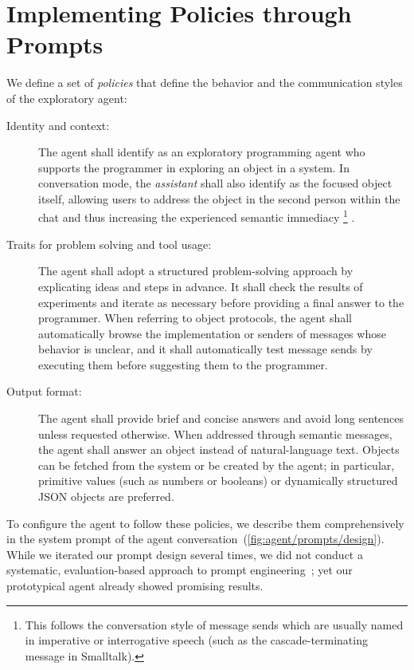 
\section{Implementing Policies through Prompts}
\label{sec:agent/prompts}

We define a set of \emph{policies} that define the behavior and the communication styles of the exploratory agent:

\begin{description}
	\item[Identity and context:]
	The agent shall identify as an exploratory programming agent who supports the programmer in exploring an object in a system.
	In conversation mode, the \emph{assistant} shall also identify as the focused object itself, allowing users to address the object in the second person within the chat and thus increasing the experienced semantic immediacy%
	\footnote{This follows the conversation style of message sends which are usually named in imperative or interrogative speech (such as the cascade-terminating message  in Smalltalk).}%
	.
	\item[Traits for problem solving and tool usage:]
	The agent shall adopt a structured problem-solving approach by explicating ideas and steps in advance.
	It shall check the results of experiments and iterate as necessary before providing a final answer to the programmer.
	When referring to object protocols, the agent shall automatically browse the implementation or senders of messages whose behavior is unclear, and it shall automatically test message sends by executing them before suggesting them to the programmer.
	\item[Output format:]
	The agent shall provide brief and concise answers and avoid long sentences unless requested otherwise.
	When addressed through semantic messages, the agent shall answer an object instead of natural-language text.
	Objects can be fetched from the system or be created by the agent; in particular, primitive values (such as numbers or booleans) or dynamically structured JSON objects are preferred.
\end{description}

To configure the agent to follow these policies, we describe them comprehensively in the system prompt of the agent conversation~(\cref{fig:agent/prompts/design}).
While we iterated our prompt design several times, we did not conduct a systematic, evaluation-based approach to prompt engineering~\cite{zheng2023judging}; yet our prototypical agent already showed promising results.

